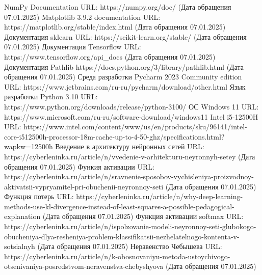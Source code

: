 \begin{thebibliography}{}
	NumPy Documentation
    URL: https://numpy.org/doc/ (Дата обращения 07.01.2025)
	Matplotlib 3.9.2 documentation
    URL: https://matplotlib.org/stable/index.html (Дата обращения 07.01.2025)
	Документация sklearn
    URL: https://scikit-learn.org/stable/ (Дата обращения 07.01.2025)
	Документация Tensorflow
	URL: https://www.tensorflow.org/api\_docs (Дата обращения 07.01.2025)
	Документация Pathlib
	https://docs.python.org/3/library/pathlib.html (Дата обращения 07.01.2025)
	Среда разработки Pycharm 2023 Community edition
	URL: https://www.jetbrains.com/ru-ru/pycharm/download/other.html
	Язык разработки Python 3.10
	URL: https://www.python.org/downloads/release/python-3100/
	ОС Windows 11
	URL: https://www.microsoft.com/ru-ru/software-download/windows11
	Intel i5-12500H
	URL: https://www.intel.com/content/www/us/en/products/sku/96141/intel-core-i512500h-processor-18m-cache-up-to-4-50-ghz/specifications.html?wapkw=12500h
	Введение в архитектуру нейронных сетей
	URL: https://cyberleninka.ru/article/n/vvedenie-v-arhitekturu-neyronnyh-setey (Дата обращения 07.01.2025)
	Функия активации
	URL: https://cyberleninka.ru/article/n/sravnenie-sposobov-vychisleniya-proizvodnoy-aktivatsii-vypryamitel-pri-obuchenii-neyronnoy-seti (Дата обращения 07.01.2025)
	Функция потерь
	URL: https://cyberleninka.ru/article/n/why-deep-learning-methods-use-kl-divergence-instead-of-least-squares-a-possible-pedagogical-explanation (Дата обращения 07.01.2025)
	Функция активации softmax
	URL: https://cyberleninka.ru/article/n/ispolzovanie-modeli-neyronnoy-seti-glubokogo-obucheniya-dlya-resheniya-problem-klassifikatsii-nezhelatelnogo-kontenta-v-sotsialnyh (Дата обращения 07.01.2025)
	Неравенство Чебышева
	URL: https://cyberleninka.ru/article/n/k-obosnovaniyu-metoda-ustoychivogo-otsenivaniya-posredstvom-neravenstva-chebyshyova (Дата обращения 07.01.2025)
\end{thebibliography}